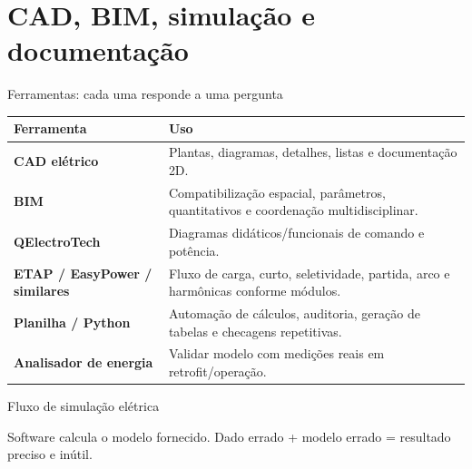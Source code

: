 \section{CAD, BIM, simulação e documentação}

\begin{frame}{Ferramentas: cada uma responde a uma pergunta}
\scriptsize
\begin{tabularx}{\textwidth}{>{\bfseries}p{2.6cm}X}
\toprule
Ferramenta & Uso \\
\midrule
CAD elétrico & Plantas, diagramas, detalhes, listas e documentação 2D. \\
BIM & Compatibilização espacial, parâmetros, quantitativos e coordenação multidisciplinar. \\
QElectroTech & Diagramas didáticos/funcionais de comando e potência. \\
ETAP / EasyPower / similares & Fluxo de carga, curto, seletividade, partida, arco e harmônicas conforme módulos. \\
Planilha / Python & Automação de cálculos, auditoria, geração de tabelas e checagens repetitivas. \\
Analisador de energia & Validar modelo com medições reais em retrofit/operação. \\
\bottomrule
\end{tabularx}
\end{frame}

\begin{frame}{Fluxo de simulação elétrica}
\small
\centering
{}
\vspace{2mm}
\begin{caixaAt}
Software calcula o modelo fornecido. Dado errado + modelo errado = resultado preciso e inútil.
\end{caixaAt}
\end{frame}


